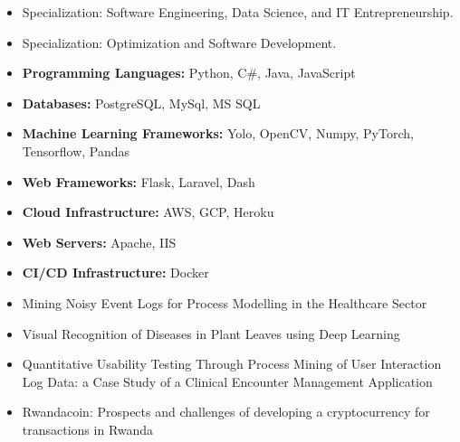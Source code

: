 \begin{itemize}
\item Specialization: Software Engineering, Data Science, and IT Entrepreneurship.
\end{itemize}
{}
\begin{itemize}
\item Specialization: Optimization and Software Development.
\end{itemize}



\begin{itemize}
    \item \textbf{Programming Languages:} Python, C\#, Java, JavaScript \\
    \item \textbf{Databases:} PostgreSQL, MySql, MS SQL \\
    \item \textbf{Machine Learning Frameworks:} Yolo, OpenCV, Numpy, PyTorch, Tensorflow, Pandas \\
    \item \textbf{Web Frameworks:} Flask, Laravel, Dash \\
    \item \textbf{Cloud Infrastructure:} AWS, GCP, Heroku \\
    \item \textbf{Web Servers:} Apache, IIS\\
    \item \textbf{CI/CD Infrastructure:} Docker
\end{itemize}

\begin{itemize}
    \item Mining Noisy Event Logs for Process Modelling in the Healthcare Sector
    \item Visual Recognition of Diseases in Plant Leaves using Deep Learning
    \item Quantitative Usability Testing Through Process Mining of User Interaction Log Data: a Case Study of a Clinical Encounter Management Application
    \item Rwandacoin: Prospects and challenges of developing a cryptocurrency for transactions in Rwanda
\end{itemize}

